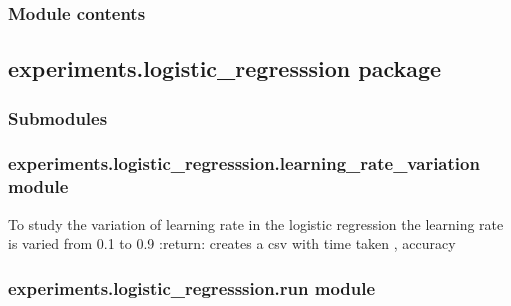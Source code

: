 \documentclass[letterpaper,10pt,english]{sphinxmanual}
\begin{document}
\subsubsection{Module contents}
\label{\detokenize{experiments.knn:module-experiments.knn}}\label{\detokenize{experiments.knn:module-contents}}

\subsection{experiments.logistic\_regresssion package}
\label{\detokenize{experiments.logistic_regresssion:experiments-logistic-regresssion-package}}\label{\detokenize{experiments.logistic_regresssion::doc}}

\subsubsection{Submodules}
\label{\detokenize{experiments.logistic_regresssion:submodules}}

\subsubsection{experiments.logistic\_regresssion.learning\_rate\_variation module}
\label{\detokenize{experiments.logistic_regresssion:module-experiments.logistic_regresssion.learning_rate_variation}}\label{\detokenize{experiments.logistic_regresssion:experiments-logistic-regresssion-learning-rate-variation-module}}

\begin{fulllineitems}
\label{\detokenize{experiments.logistic_regresssion:experiments.logistic_regresssion.learning_rate_variation.learning_rate_variation}}
To study the variation of learning rate in the logistic regression
the learning rate is varied from 0.1 to 0.9
:return:  creates a csv with time taken , accuracy

\end{fulllineitems}



\subsubsection{experiments.logistic\_regresssion.run module}
\label{\detokenize{experiments.logistic_regresssion:experiments-logistic-regresssion-run-module}}\label{\detokenize{experiments.logistic_regresssion:module-experiments.logistic_regresssion.run}}
\end{document}
